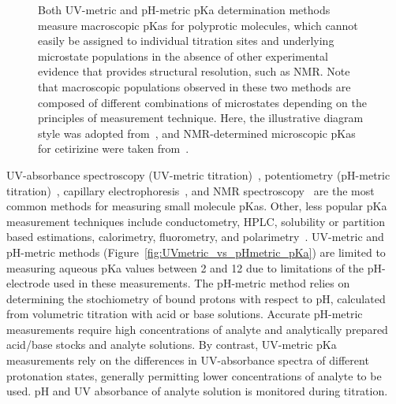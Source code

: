 \documentclass[9pt,lineno]{elife}
\begin{document}
\begin{figure}
\begin{center}
{Both UV-metric and pH-metric pKa determination methods measure macroscopic pKas for polyprotic molecules, which cannot easily be assigned to individual titration sites and underlying microstate populations in the absence of other experimental evidence that provides structural resolution, such as NMR. 
Note that macroscopic populations observed in these two methods are composed of different combinations of microstates depending on the principles of measurement technique.
Here, the illustrative diagram style was adopted from~\citep{rupp_predicting_2011}, and NMR-determined microscopic pKas for cetirizine were taken from~\citep{marosi_triprotic_2009}. 
}
\label{fig:micro_vs_macro_pKa}
\end{center}
\end{figure}

UV-absorbance spectroscopy (UV-metric titration)~\citep{tam_multi-wavelength_2001, allen_multiwavelength_1998,comer_ionization_2014}, potentiometry (pH-metric titration)~\citep{avdeef_ph-metric_1999,comer_ionization_2014}, capillary electrophoresis~\citep{WAN2002369,cabot_novel_2015}, and NMR spectroscopy~\citep{bezencon_pka_2014} are the most common methods for measuring small molecule pKas. 
Other, less popular pKa measurement techniques include conductometry, HPLC, solubility or partition based estimations, calorimetry, fluorometry, and polarimetry~\citep{reijenga_development_2013}. 
UV-metric and pH-metric methods (Figure~\ref{fig:UVmetric_vs_pHmetric_pKa}) are limited to measuring aqueous pKa values between 2 and 12 due to limitations of the pH-electrode used in these measurements. 
The pH-metric method relies on determining the stochiometry of bound protons with respect to pH, calculated from volumetric titration with acid or base solutions. Accurate pH-metric measurements require high concentrations of analyte and analytically prepared acid/base stocks and analyte solutions. 
By contrast, UV-metric pKa measurements rely on the differences in UV-absorbance spectra of different protonation states, generally permitting lower concentrations of analyte to be used.
pH and UV absorbance of analyte solution is monitored during titration. 
\end{document}

